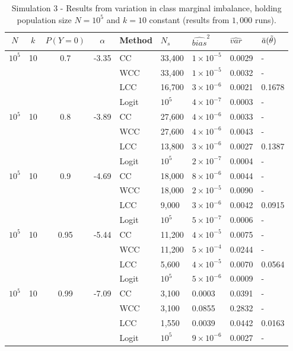 \begin{table}[ht]
    \centering
    \begin{tabular}{cccclllll}
    \toprule
    $N$ & $k$ & $P(Y=0)$ & $\alpha$ & Method & $N_s$ & $\widehat{bias}^2$ & $\widehat{var}$ & $\Bar{a}(\Tilde{\theta})$\\
    \midrule
    $10^5$ & 10 & 0.7 & -3.35 & CC & 33,400 & $1\times 10^{-5}$ & 0.0029 & - \\
     & & & & WCC & 33,400 & $1\times 10^{-5}$ & 0.0032 & - \\
     & & & & LCC & 16,700 & $3\times 10^{-6}$ & 0.0021 & 0.1678\\
     & & & & Logit & $10^5$ & $4\times10^{-7}$ & 0.0003 & -\\
     \midrule
    $10^5$ & 10 & 0.8 & -3.89 & CC & 27,600  & $4\times10^{-6}$ & 0.0033 & -\\
     & & & & WCC & 27,600 & $4\times10^{-6}$ & 0.0043 & - \\
     & & & & LCC & 13,800 & $3\times10^{-6}$ & 0.0027 & 0.1387 \\
     & & & & Logit & $10^5$ & $2\times10^{-7}$ & 0.0004 & -\\
    \midrule
    $10^5$ & 10 & 0.9 & -4.69 & CC & 18,000 & $8\times10^{-6}$ & 0.0044 & - \\
     & & & & WCC & 18,000 & $2\times10^{-5}$ & 0.0090 & -\\
     & & & & LCC & 9,000 & $3\times10^{-6}$ & 0.0042 & 0.0915 \\
     & & & & Logit & $10^5$ & $5\times10^{-7}$ & 0.0006 & -\\
     \midrule
    $10^5$ & 10 & 0.95 & -5.44 & CC & 11,200 & $4\times10^{-5}$ & 0.0075 & - \\
     & & & & WCC & 11,200 & $5\times10^{-4}$ & 0.0244 & -\\
     & & & & LCC & 5,600 & $4\times10^{-5}$ & 0.0070 &0.0564 \\
     & & & & Logit & $10^5$ & $5\times10^{-6}$ & 0.0009 & -\\
     \midrule
    $10^5$ & 10 & 0.99 & -7.09 & CC & 3,100 & 0.0003 & 0.0391 & -\\
     & & & & WCC & 3,100 & 0.0855 & 0.2832 & -\\
     & & & & LCC & 1,550 & 0.0039 & 0.0442 & 0.0163 \\
     & & & & Logit & $10^{5}$ & $9\times10^{-6}$ & 0.0027 & -\\
    \bottomrule
    \end{tabular}
    \caption[Simulation 3 - Increasing marginal imbalance for $N=10^5$ and $k=10$]{Simulation 3 - Results from variation in class marginal imbalance, holding population size $N=10^5$ and $k=10$ constant (results from $1,000$ runs).}
    \label{tab:sim_prob_a2}
\end{table}

